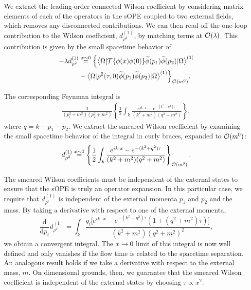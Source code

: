 We extract the leading-order connected Wilson coefficient by considering matrix 
elements of each of 
the operators in the sOPE coupled to two external fields, which removes any 
disconnected contributions.
We can then read off the one-loop contribution to the Wilson coefficient, 
$d_{\rho^2}^{(1)}$, by matching terms at ${\cal O}(\lambda)$. This 
contribution is given by the small spacetime behavior of
\begin{align}
-\lambda d_{\rho^2}^{(1)} {} & \stackrel{x\sim 0}{=}  
\Big\{ \big\langle \Omega | {\cal T}\{ 
\phi(x){} \phi(0)\}  
\widetilde{\phi}(p_1) \widetilde{\phi}(p_2) | \Omega \big\rangle^{(1)} 
\nonumber\\
{} & - \big\langle \Omega | \rho^2(\tau,0) 
\widetilde{\phi}(p_1) \widetilde{\phi}(p_2) | \Omega 
\big\rangle^{(1)}\Big\}_{{\cal O}(m^0)}.
\end{align}  

The corresponding Feynman integral 
is
\begin{align}\label{eq:curlyb}
\frac{1}{(p^2_1+m^2)(p_2^2+m^2)}\left\{\frac{1}{2}\int_k 
\frac{e^{ik\cdot x} - e^{-(k^2+q^2) \tau }}{(k^2+m^2)(q^2+m^2)}\right\},
\end{align}
where $q = k-p_1-p_2$. We extract the smeared Wilson 
coefficient by examining the small spacetime behavior of the 
integral in curly braces, expanded to ${\cal O}(m^0)$:
\begin{align}\label{eq:drho1}
d_{\rho^2}^{(1)} \stackrel{x\sim 0}{=} \left\{
\frac{1}{2}\int_k 
\frac{e^{ik\cdot x} - e^{-(k^2+q^2)\tau }}{(k^2+m^2)(q^2+m^2)}\right\}_{{\cal 
O}(m^0)}.
\end{align}

The 
smeared Wilson coefficients must be 
independent of the external states to ensure that the sOPE is truly an operator 
expansion. In this particular case, 
we require that 
$d_{\rho^2}^{(1)}$ is independent of the external momenta 
$p_1$ and $p_2$ and the mass. By taking 
a derivative with respect to one of the external momenta,
\begin{equation}\label{eq:drhoderiv}
\frac{\mathrm{d}}{\mathrm{d}p_i}d_{\rho^2}^{(1)} =
 \int_k \frac{q_i\big[e^{ik\cdot x} - 
e^{-(k^2+q^2)\tau}(1+(q^2+m^2)\tau)\big]}{(k^2+m^2)(q^2+m^2)^2},
\end{equation}
we obtain a convergent integral. The $x\rightarrow 0$ limit of this integral is 
now well defined and only vanishes if the flow time is 
related to the spacetime separation. An analogous result holds if we take a 
derivative with respect to the external mass, $m$. On dimensional grounds, 
then, we 
guarantee that the smeared Wilson coefficient is independent of the external 
states by choosing $\tau \propto x^2$.

